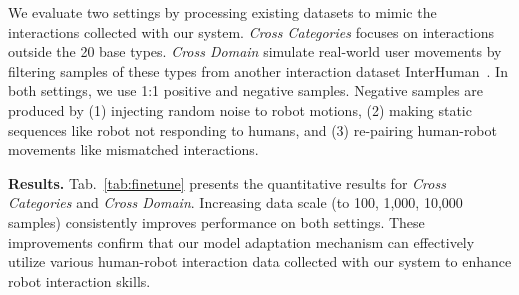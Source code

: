 We evaluate two settings by processing existing datasets to mimic the interactions collected with our system. \textit{Cross Categories} focuses on interactions outside the 20 base types. \textit{Cross Domain} simulate real-world user movements by filtering samples of these types from another interaction dataset InterHuman~\cite{liang2024intergen}. 
%
In both settings, we use 1:1 positive and negative samples. Negative samples are produced by (1) injecting random noise to robot motions, (2) making static sequences like robot not responding to humans, and (3) re-pairing human-robot movements like mismatched interactions.

\noindent\textbf{Results.}
Tab.~\ref{tab:finetune} presents the quantitative results for \emph{Cross Categories} and \emph{Cross Domain}.
Increasing data scale (to 100, 1,000, 10,000 samples) consistently improves performance on both settings. These improvements confirm that our model adaptation mechanism can effectively utilize
various human-robot interaction data collected with our system to enhance robot interaction skills.





